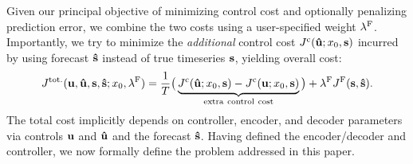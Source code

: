 Given our principal objective of minimizing control cost and optionally penalizing prediction error, we combine the two costs using a user-specified weight $\lambda^{\mathrm{F}}$. 
Importantly, we try to minimize the \textit{additional} control cost $J^{\mathrm{c}}(\bold{\hat{u}}; x_0, \bold{s})$ incurred by using forecast $\bold{\hat{s}}$ instead of true timeseries $\bold{s}$, yielding overall cost:
\begin{align}
     J^{\mathrm{tot.}}(\bold{u}, \bold{\hat{u}}, \bold{s}, \bold{\hat{s}}; x_0, \lambda^{\mathrm{F}}) = \frac{1}{T}\big(\underbrace{J^{\mathrm{c}}(\bold{\hat{u}}; x_0, \bold{s}) - J^{\mathrm{c}}(\bold{u}; x_0, \bold{s})}_{\mathrm{extra ~control~ cost}}\big) + \lambda^{\mathrm{F}} J^{\mathrm{F}}(\bold{s}, \bold{\hat{s}}). 
    \label{eq:weighted_cost}
\end{align}
The total cost implicitly depends on controller, encoder, and decoder parameters via controls $\bold{u}$ and $\bold{\hat{u}}$ and the forecast $\bold{\hat{s}}$.
Having defined the encoder/decoder and controller, we now formally define the problem addressed in this paper.
